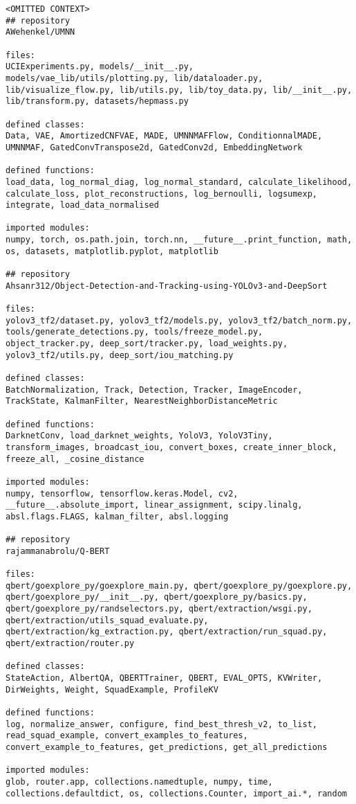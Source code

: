 \begin{samepage}
\begin{lstlisting}[caption=Input repository]
<OMITTED CONTEXT>
## repository
AWehenkel/UMNN

files:
UCIExperiments.py, models/__init__.py, models/vae_lib/utils/plotting.py, lib/dataloader.py, lib/visualize_flow.py, lib/utils.py, lib/toy_data.py, lib/__init__.py, lib/transform.py, datasets/hepmass.py

defined classes:
Data, VAE, AmortizedCNFVAE, MADE, UMNNMAFFlow, ConditionnalMADE, UMNNMAF, GatedConvTranspose2d, GatedConv2d, EmbeddingNetwork

defined functions:
load_data, log_normal_diag, log_normal_standard, calculate_likelihood, calculate_loss, plot_reconstructions, log_bernoulli, logsumexp, integrate, load_data_normalised

imported modules:
numpy, torch, os.path.join, torch.nn, __future__.print_function, math, os, datasets, matplotlib.pyplot, matplotlib

## repository
Ahsanr312/Object-Detection-and-Tracking-using-YOLOv3-and-DeepSort

files:
yolov3_tf2/dataset.py, yolov3_tf2/models.py, yolov3_tf2/batch_norm.py, tools/generate_detections.py, tools/freeze_model.py, object_tracker.py, deep_sort/tracker.py, load_weights.py, yolov3_tf2/utils.py, deep_sort/iou_matching.py

defined classes:
BatchNormalization, Track, Detection, Tracker, ImageEncoder, TrackState, KalmanFilter, NearestNeighborDistanceMetric

defined functions:
DarknetConv, load_darknet_weights, YoloV3, YoloV3Tiny, transform_images, broadcast_iou, convert_boxes, create_inner_block, freeze_all, _cosine_distance

imported modules:
numpy, tensorflow, tensorflow.keras.Model, cv2, __future__.absolute_import, linear_assignment, scipy.linalg, absl.flags.FLAGS, kalman_filter, absl.logging

## repository
rajammanabrolu/Q-BERT

files:
qbert/goexplore_py/goexplore_main.py, qbert/goexplore_py/goexplore.py, qbert/goexplore_py/__init__.py, qbert/goexplore_py/basics.py, qbert/goexplore_py/randselectors.py, qbert/extraction/wsgi.py, qbert/extraction/utils_squad_evaluate.py, qbert/extraction/kg_extraction.py, qbert/extraction/run_squad.py, qbert/extraction/router.py

defined classes:
StateAction, AlbertQA, QBERTTrainer, QBERT, EVAL_OPTS, KVWriter, DirWeights, Weight, SquadExample, ProfileKV

defined functions:
log, normalize_answer, configure, find_best_thresh_v2, to_list, read_squad_example, convert_examples_to_features, convert_example_to_features, get_predictions, get_all_predictions

imported modules:
glob, router.app, collections.namedtuple, numpy, time, collections.defaultdict, os, collections.Counter, import_ai.*, random
\end{lstlisting}
\end{samepage}


\begin{samepage}
\begin{lstlisting}[caption=Generated text]

\end{lstlisting}
\end{samepage}
